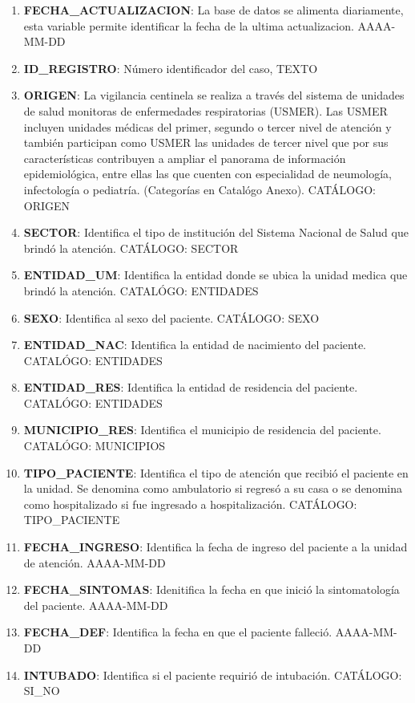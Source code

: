 \begin{enumerate}
	\item \textbf{FECHA\_ACTUALIZACION}: La base de datos se alimenta diariamente, esta variable permite identificar la fecha de la ultima actualizacion. AAAA-MM-DD
	\item \textbf{ID\_REGISTRO}: Número identificador del caso, TEXTO
	\item \textbf{ORIGEN}: La vigilancia centinela se realiza a través del sistema de unidades de salud monitoras de enfermedades respiratorias (USMER). Las USMER incluyen unidades médicas del primer, segundo o tercer nivel de atención y también participan como USMER las unidades de tercer nivel que por sus características contribuyen a ampliar el panorama de información epidemiológica, entre ellas las que cuenten con especialidad de neumología, infectología o pediatría. (Categorías en Catalógo Anexo). CATÁLOGO: ORIGEN
	\item \textbf{SECTOR}: Identifica el tipo de institución del Sistema Nacional de Salud que brindó la atención. CATÁLOGO: SECTOR
	\item \textbf{ENTIDAD\_UM}: Identifica la entidad donde se ubica la unidad medica que brindó la atención. CATALÓGO: ENTIDADES
	\item \textbf{SEXO}: Identifica al sexo del paciente. CATÁLOGO: SEXO
	\item \textbf{ENTIDAD\_NAC}: Identifica la entidad de nacimiento del paciente. CATALÓGO: ENTIDADES
	\item \textbf{ENTIDAD\_RES}: Identifica la entidad de residencia del paciente. CATALÓGO: ENTIDADES
	\item \textbf{MUNICIPIO\_RES}: Identifica el municipio de residencia del paciente. CATALÓGO: MUNICIPIOS
	\item \textbf{TIPO\_PACIENTE}: Identifica el tipo de atención que recibió el paciente en la unidad. Se denomina como ambulatorio si regresó a su casa o se denomina como hospitalizado si fue ingresado a hospitalización. CATÁLOGO: TIPO\_PACIENTE
	\item \textbf{FECHA\_INGRESO}: Identifica la fecha de ingreso del paciente a la unidad de atención. AAAA-MM-DD
	\item \textbf{FECHA\_SINTOMAS}: Idenitifica la fecha en que inició la sintomatología del paciente. AAAA-MM-DD
	\item \textbf{FECHA\_DEF}: Identifica la fecha en que el paciente falleció. AAAA-MM-DD
	\item \textbf{INTUBADO}: Identifica si el paciente requirió de intubación. CATÁLOGO: SI\_NO

\end{enumerate}
